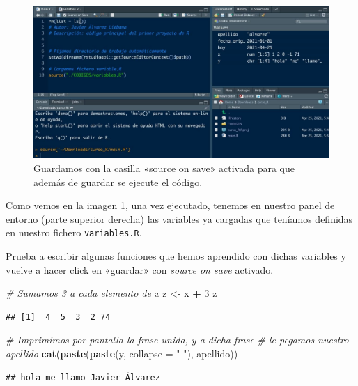 \documentclass[11pt,]{book}
\newenvironment{Shaded}{\begin{snugshade}}{\end{snugshade}}
\newcommand{\CommentTok}[1]{\textcolor[rgb]{0.37,0.37,0.37}{\textit{#1}}}
\newcommand{\DataTypeTok}[1]{\textcolor[rgb]{0.27,0.27,0.27}{#1}}
\newcommand{\DecValTok}[1]{\textcolor[rgb]{0.06,0.06,0.06}{#1}}
\newcommand{\KeywordTok}[1]{\textcolor[rgb]{0.27,0.27,0.27}{\textbf{#1}}}
\newcommand{\NormalTok}[1]{#1}
\newcommand{\OperatorTok}[1]{\textcolor[rgb]{0.43,0.43,0.43}{\textbf{#1}}}
\newcommand{\StringTok}[1]{\textcolor[rgb]{0.5,0.5,0.5}{#1}}
\begin{document}
\begin{figure}

{\centering \includegraphics[width=0.5\linewidth]{./img/source_on_save} 

}

\caption{Guardamos con la casilla «source on save» activada para que además de guardar se ejecute el código.}\label{fig:source-on-save}
\end{figure}

Como vemos en la imagen \ref{fig:source-on-save}, una vez ejecutado, tenemos en nuestro panel de entorno (parte superior derecha) las variables ya cargadas que teníamos definidas en nuestro fichero \texttt{variables.R}.

Prueba a escribir algunas funciones que hemos aprendido con dichas variables y vuelve a hacer click en «guardar» con \emph{source on save} activado.

\begin{Shaded}
\begin{Highlighting}[]
\CommentTok{# Sumamos 3 a cada elemento de x}
\NormalTok{z <-}\StringTok{ }\NormalTok{x }\OperatorTok{+}\StringTok{ }\DecValTok{3}
\NormalTok{z}
\end{Highlighting}
\end{Shaded}

\begin{verbatim}
## [1]  4  5  3  2 74
\end{verbatim}

\begin{Shaded}
\begin{Highlighting}[]
\CommentTok{# Imprimimos por pantalla la frase unida, y a dicha frase}
\CommentTok{# le pegamos nuestro apellido}
\KeywordTok{cat}\NormalTok{(}\KeywordTok{paste}\NormalTok{(}\KeywordTok{paste}\NormalTok{(y, }\DataTypeTok{collapse =} \StringTok{" "}\NormalTok{), apellido))}
\end{Highlighting}
\end{Shaded}

\begin{verbatim}
## hola me llamo Javier Álvarez
\end{verbatim}
\end{document}
